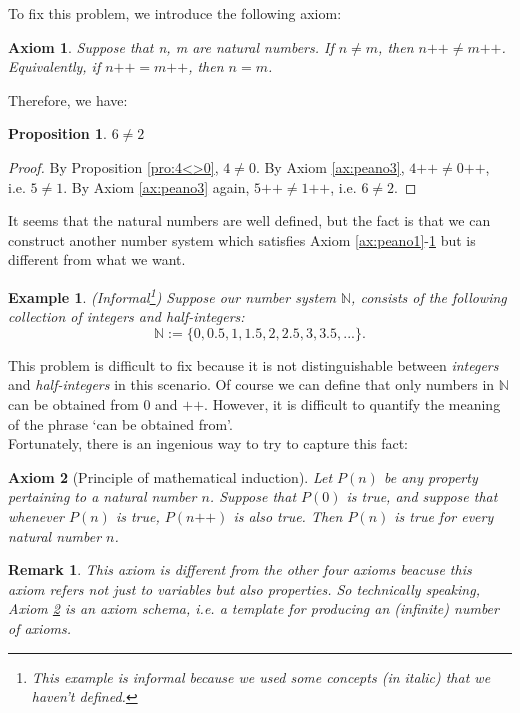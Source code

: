 \documentclass[a4paper,oneside]{book}
\newtheorem*{proof}{\textit{Proof.}}
\newtheorem{axiom}{Axiom}[chapter]
\newtheorem{example}{Example}[section]
\newtheorem{remark}{Remark}[section]
\newtheorem{proposition}{Proposition}[section]
\begin{document}
			To fix this problem, we introduce the following axiom:
			\begin{axiom}
				\label{ax:peano4}
				Suppose that n, m are natural numbers. If $ n \neq m$, then $ n\texttt{++} \neq  m \texttt{++}$. Equivalently, if $ n\texttt{++} =  m \texttt{++}$, then $n = m$.
			\end{axiom}
			Therefore, we have:
			\begin{proposition}
				$6 \neq 2$
			\end{proposition}
			\begin{proof}
				By Proposition \ref{pro:4<>0}, $4 \neq 0$. By Axiom \ref{ax:peano3}, $4\texttt{++} \neq  0 \texttt{++}$, i.e. $5 \neq 1$. By Axiom \ref{ax:peano3} again, $5\texttt{++} \neq  1 \texttt{++}$, i.e. $6 \neq 2$.
			\end{proof}
			It seems that the natural numbers are well defined, but the fact is that we can construct another number system which satisfies Axiom \ref{ax:peano1}-\ref{ax:peano4} but is different from what we want.
			\begin{example}
				(Informal\footnote{This example is informal because we used some concepts (in italic) that we haven't defined.}) Suppose our number system $\mathbb{N}$, consists of the following collection of \textit{integers} and \textit{half-integers}:
				\begin{equation*}
					\mathbb{N} := \{0,0.5,1,1.5,2,2.5,3,3.5,...\}.
				\end{equation*}
      \end{example}
			This problem is difficult to fix because it is not distinguishable between \textit{integers} and \textit{half-integers} in this scenario. Of course we can define that only numbers in $\mathbb{N}$ can be obtained from $0$ and $\texttt{++}$. However, it is difficult to quantify the meaning of the phrase `can be obtained from'.\\
			Fortunately, there is an ingenious way to try to capture this fact:
			\begin{axiom}[Principle of mathematical induction]
				\label{ax:peano5}
				Let $P(n)$ be any property pertaining to a natural number $n$. Suppose that $P(0)$ is true, and suppose that whenever $P(n)$ is true, $P(n\texttt{++})$ is also true. Then $P(n)$ is true for every natural number $n$.
      \end{axiom}
			\begin{remark}
				This axiom is different from the other four axioms beacuse this axiom refers not just to \textit{variables} but also \textit{properties}. So technically speaking, Axiom \ref{ax:peano5} is an \textit{axiom schema}, i.e. a template for producing an (infinite) number of axioms.
			\end{remark}
\end{document}
